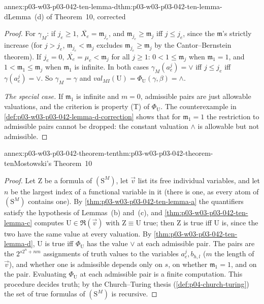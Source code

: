 \begin{annexitem}{annex:p03-w03-p03-042-ten-lemma-d}{thm:p03-w03-p03-042-ten-lemma-d}{Lemma~(d) of Theorem~10, corrected}
\begin{proof}
For \(\gamma_M\): if \(j_e\geq1\), \(\overline{X_e}=\mathfrak m_{j_e}\),
and \(\mathfrak m_{j_e}\geq\mathfrak m_j\) iff \(j\leq j_e\), since the
\(\mathfrak m\)'s strictly increase (for \(j>j_e\),
\(\mathfrak m_{j_e}<\mathfrak m_j\) excludes \(\mathfrak m_{j_e}\geq
\mathfrak m_j\) by the Cantor--Bernstein theorem).  If \(j_e=0\),
\(\overline{X_e}=\mu_e<\mathfrak m_j\) for all \(j\geq1\): \(0<1\leq
\mathfrak m_j\) when \(\mathfrak m_1=1\), and \(1<\mathfrak m_1\leq
\mathfrak m_j\) when \(\mathfrak m_1\) is infinite.  In both cases
\(\gamma_M(a^j_e)=\vee\) iff \(j\leq j_e\) iff \(\gamma(a^j_e)=\vee\).
So \(\gamma_M=\gamma\) and \(\mathit{val}_{MI}(\mathrm U)=\Phi_{\mathrm
U}(\gamma,\beta)=\wedge\).

\emph{The special case.}  If \(\mathfrak m_1\) is infinite and \(m=0\),
admissible pairs are just allowable valuations, and the criterion is
property (T) of \(\Phi_{\mathrm U}\).  The counterexample in
\cref{def:p03-w03-p03-042-lemma-d-correction} shows that for
\(\mathfrak m_1=1\) the restriction to admissible pairs cannot be
dropped: the constant valuation \(\wedge\) is allowable but not
admissible.
\end{proof}
\end{annexitem}

\begin{annexitem}{annex:p03-w03-p03-042-theorem-ten}{thm:p03-w03-p03-042-theorem-ten}{Mostowski's Theorem~10}
\begin{proof}
Let \(\mathrm Z\) be a formula of \((\mathrm S^M)\), let \(\vec v\) list
its free individual variables, and let \(n\) be the largest index of a
functional variable in it (there is one, as every atom of \((\mathrm
S^M)\) contains one).  By \cref{thm:p03-w03-p03-042-ten-lemma-a} the
quantifiers satisfy the hypothesis of Lemmas~(b) and~(c), and
\cref{thm:p03-w03-p03-042-ten-lemma-c} computes \(\mathrm U\in\mathfrak
R(\vec v)\) with \(\mathrm Z\equiv\mathrm U\) true; then \(\mathrm Z\) is
true iff \(\mathrm U\) is, since the two have the same value at every
valuation.  By \cref{thm:p03-w03-p03-042-ten-lemma-d}, \(\mathrm U\) is
true iff \(\Phi_{\mathrm U}\) has the value \(\vee\) at each admissible
pair.  The pairs are the \(2^{s2^n+nm}\) assignments of truth values to
the variables \(a^j_e,b_{h,l}\) (\(m\) the length of \(\vec v\)), and
whether one is admissible depends only on \(s\), on whether
\(\mathfrak m_1=1\), and on the pair.  Evaluating \(\Phi_{\mathrm U}\) at
each admissible pair is a finite computation.  This procedure decides
truth; by the Church--Turing thesis (\cref{def:p04-church-turing}) the
set of true formulas of \((\mathrm S^M)\) is recursive.
\end{proof}
\end{annexitem}

